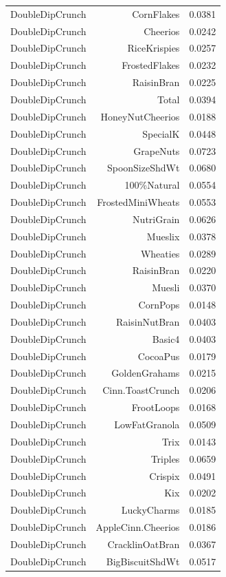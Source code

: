 \begin{longtable}{@{}lrr@{}}
DoubleDipCrunch & CornFlakes & 0.0381 \\
DoubleDipCrunch & Cheerios & 0.0242 \\
DoubleDipCrunch & RiceKrispies & 0.0257 \\
DoubleDipCrunch & FrostedFlakes & 0.0232 \\
DoubleDipCrunch & RaisinBran & 0.0225 \\
DoubleDipCrunch & Total & 0.0394 \\
DoubleDipCrunch & HoneyNutCheerios & 0.0188 \\
DoubleDipCrunch & SpecialK & 0.0448 \\
DoubleDipCrunch & GrapeNuts & 0.0723 \\
DoubleDipCrunch & SpoonSizeShdWt & 0.0680 \\
DoubleDipCrunch & 100\%Natural & 0.0554 \\
DoubleDipCrunch & FrostedMiniWheats & 0.0553 \\
DoubleDipCrunch & NutriGrain & 0.0626 \\
DoubleDipCrunch & Mueslix & 0.0378 \\
DoubleDipCrunch & Wheaties & 0.0289 \\
DoubleDipCrunch & RaisinBran & 0.0220 \\
DoubleDipCrunch & Muesli & 0.0370 \\
DoubleDipCrunch & CornPops & 0.0148 \\
DoubleDipCrunch & RaisinNutBran & 0.0403 \\
DoubleDipCrunch & Basic4 & 0.0403 \\
DoubleDipCrunch & CocoaPus & 0.0179 \\
DoubleDipCrunch & GoldenGrahams & 0.0215 \\
DoubleDipCrunch & Cinn.ToastCrunch & 0.0206 \\
DoubleDipCrunch & FrootLoops & 0.0168 \\
DoubleDipCrunch & LowFatGranola & 0.0509 \\
DoubleDipCrunch & Trix & 0.0143 \\
DoubleDipCrunch & Triples & 0.0659 \\
DoubleDipCrunch & Crispix & 0.0491 \\
DoubleDipCrunch & Kix & 0.0202 \\
DoubleDipCrunch & LuckyCharms & 0.0185 \\
DoubleDipCrunch & AppleCinn.Cheerios & 0.0186 \\
DoubleDipCrunch & CracklinOatBran & 0.0367 \\
DoubleDipCrunch & BigBiscuitShdWt & 0.0517 \\

\end{longtable}
